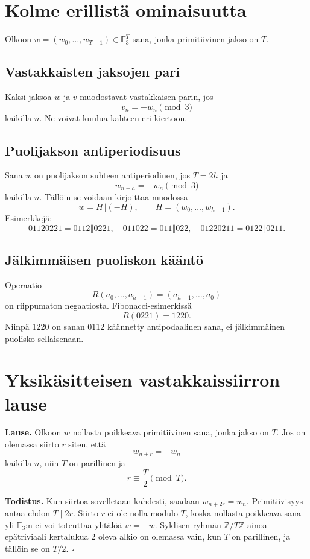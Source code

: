 \documentclass[11pt,a4paper]{article}
\newcommand{\F}{\mathbb{F}}
\newcommand{\Z}{\mathbb{Z}}
\newcommand{\oplusword}{\mathbin{\Vert}}
\begin{document}
\section{Kolme erillistä ominaisuutta}
Olkoon $w=(w_0,\ldots,w_{T-1})\in\F_3^T$ sana, jonka primitiivinen jakso on $T$.

\subsection{Vastakkaisten jaksojen pari}
Kaksi jaksoa $w$ ja $v$ muodostavat vastakkaisen parin, jos
\[
v_n=-w_n\pmod3
\]
kaikilla $n$. Ne voivat kuulua kahteen eri kiertoon.

\subsection{Puolijakson antiperiodisuus}
Sana $w$ on puolijakson suhteen antiperiodinen, jos $T=2h$ ja
\[
w_{n+h}=-w_n\pmod3
\]
kaikilla $n$. Tällöin se voidaan kirjoittaa muodossa
\[
w=H\oplusword(-H),\qquad H=(w_0,\ldots,w_{h-1}).
\]
Esimerkkejä:
\[
01120221=0112\oplusword0221,\quad 011022=011\oplusword022,\quad 01220211=0122\oplusword0211.
\]

\subsection{Jälkimmäisen puoliskon kääntö}
Operaatio
\[
R(a_0,\ldots,a_{h-1})=(a_{h-1},\ldots,a_0)
\]
on riippumaton negaatiosta. Fibonacci-esimerkissä
\[
R(0221)=1220.
\]
Niinpä 1220 on sanan 0112 käännetty antipodaalinen sana, ei jälkimmäinen puolisko sellaisenaan.

\clearpage
\section{Yksikäsitteisen vastakkaissiirron lause}
\textbf{Lause.} Olkoon $w$ nollasta poikkeava primitiivinen sana, jonka jakso on $T$. Jos on olemassa siirto $r$ siten, että
\[
w_{n+r}=-w_n
\]
kaikilla $n$, niin $T$ on parillinen ja
\[
r\equiv\frac{T}{2}\pmod T.
\]

\textbf{Todistus.} Kun siirtoa sovelletaan kahdesti, saadaan $w_{n+2r}=w_n$. Primitiivisyys antaa ehdon $T\mid2r$. Siirto $r$ ei ole nolla modulo $T$, koska nollasta poikkeava sana yli $\F_3$:n ei voi toteuttaa yhtälöä $w=-w$. Syklisen ryhmän $\Z/T\Z$ ainoa epätriviaali kertalukua 2 oleva alkio on olemassa vain, kun $T$ on parillinen, ja tällöin se on $T/2$. \hfill$\square$
\end{document}
